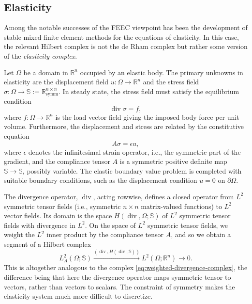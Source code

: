 \subsection{{Elasticity}}\label{sec:elasticity}

{Among the notable successes of the FEEC viewpoint has been the development of stable mixed finite element methods for the equations of elasticity. In this case, the relevant Hilbert complex is not the de Rham complex but rather some version of the \emph{elasticity complex}.}

{Let $\Omega$ be a domain in $\mathbb R^n$ occupied by an elastic body. The primary unknowns in elasticity are the displacement field $u:\Omega\to\mathbb R^n$ and the stress field $\sigma:\Omega\to\mathbb S:=\mathbb R_{\mathrm{symm}}^{n\times n}$. In steady state, the stress field must satisfy the equilibrium condition}
\[
\operatorname{div}\sigma=f,
\]
{where $f:\Omega\to\mathbb R^n$ is the load vector field giving the imposed body force per unit volume. Furthermore, the displacement and stress are related by the constitutive equation}
\[
A\sigma=\epsilon u,
\]
{where $\epsilon$ denotes the infinitesimal strain operator, i.e., the symmetric part of the gradient, and the compliance tensor $A$ is a symmetric positive definite map $\mathbb S\to\mathbb S$, possibly variable. The elastic boundary value problem is completed with suitable boundary conditions, such as the displacement condition $u=0$ on $\partial\Omega$.}

{The divergence operator, $\operatorname{div}$, acting rowwise, defines a closed operator from $L^2$ symmetric tensor fields (i.e., symmetric $n\times n$ matrix-valued functions) to $L^2$ vector fields. Its domain is the space $H(\operatorname{div},\Omega;\mathbb S)$ of $L^2$ symmetric tensor fields with divergence in $L^2$. On the space of $L^2$ symmetric tensor fields, we weight the $L^2$ inner product by the compliance tensor $A$, and so we obtain a segment of a Hilbert complex}
\begin{equation}\label{eq:elasticity-divergence-complex}
L_A^2(\Omega;\mathbb S)\xrightarrow{(\operatorname{div},H(\operatorname{div};\mathbb S))}L^2(\Omega;\mathbb R^n)\to0.
\end{equation}
{This is altogether analogous to the complex \eqref{eq:weighted-divergence-complex}, the difference being that here the divergence operator maps symmetric tensor to vectors, rather than vectors to scalars. The constraint of symmetry makes the elasticity system much more difficult to discretize.}

